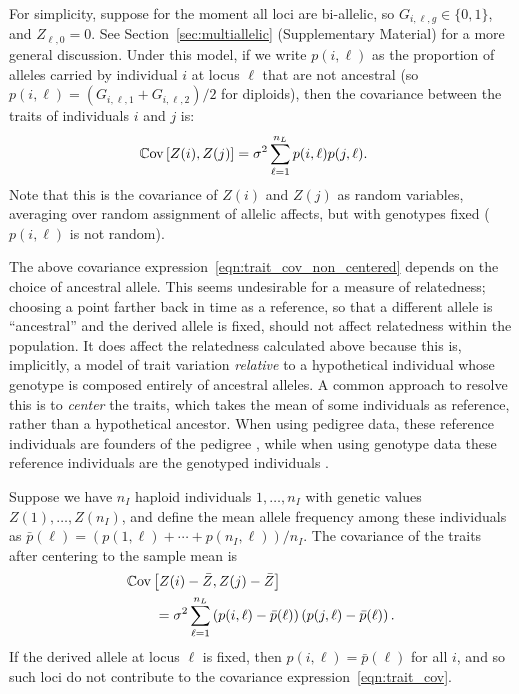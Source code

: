 For simplicity, suppose for the moment all loci are bi-allelic,
so $G_{i,\ell,g} \in \{0,1\}$, and $Z_{\ell,0} = 0$.
%
See Section~\ref{sec:multiallelic} (Supplementary Material) for a more general discussion.
%
Under this model, if we write $p(i,\ell)$ as the proportion of alleles
carried by individual $i$ at locus $\ell$ that are not ancestral
(so $p(i,\ell) = (G_{i,\ell,1} + G_{i,\ell,2})/2$ for diploids),
then the  %
covariance between the traits of individuals $i$ and $j$ is:
%
\begin{align} \label{eqn:trait_cov_non_centered}
    \mathbb{C}\text{ov}\left[Z(i), Z(j)\right] &= \sigma^2 \sum_{\ell=1}^{n_L} p(i,\ell) p(j,\ell) .
\end{align}
%
Note that this is the covariance of $Z(i)$ and $Z(j)$ as random variables,
averaging over random assignment of allelic affects,
but with genotypes fixed ($p(i,\ell)$ is not random).


The above covariance expression~\eqref{eqn:trait_cov_non_centered}
depends on the choice of ancestral allele.
%
This seems undesirable for a measure of relatedness;
choosing a point farther back in time as a reference,
so that a different allele is ``ancestral'' and the derived allele is fixed,
should not affect relatedness within the population.
%
It does affect the relatedness calculated above because this is, implicitly,
a model of trait variation \emph{relative} to a hypothetical individual
whose genotype is composed entirely of ancestral alleles.
%
A common approach to resolve this is to \emph{center} the traits,
which takes the mean of some individuals as reference,
rather than a hypothetical ancestor.
%
When using pedigree data, these reference individuals are
founders of the pedigree \citep{wright1922coefficients},
while when using genotype data these reference individuals are
the genotyped individuals \citep{vanraden2008efficient}.

Suppose we have $n_I$ haploid individuals $1, \dots, n_I$
with genetic values $Z(1), \ldots, Z(n_I)$, %
and define the mean allele frequency among these individuals as
$\bar{p}(\ell) = (p(1,\ell) + \cdots + p(n_I,\ell))/{n_I}$.
%
The covariance of the traits 
after centering to the sample mean is
%
\begin{align} \label{eqn:trait_cov}
    \begin{split}
        &\mathbb{C}\text{ov}\left[Z(i) - \bar{Z}, Z(j) - \bar{Z}\right] \\
        &\qquad = \sigma^2 \sum_{\ell=1}^{n_L}
            \left(p(i,\ell) - \bar{p}(\ell)\right) \left(p(j,\ell) - \bar{p}(\ell)\right).
    \end{split}
\end{align}
%
If the derived allele at locus $\ell$ is fixed,
then $p(i,\ell) = \bar{p}(\ell)$ for all $i$,
and so such loci do not contribute to the covariance expression~\eqref{eqn:trait_cov}.

